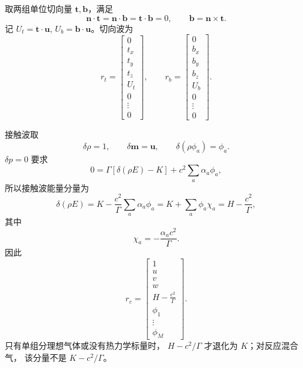 \documentclass[11pt,a4paper,fontset=fandol]{ctexart}
\newcommand{\nn}{\bm{n}}
\newcommand{\uu}{\bm{u}}
\newcommand{\Gammaone}{\Gamma}
\begin{document}
取两组单位切向量 \(\bm{t},\bm{b}\)，满足
\[
\nn\cdot\bm{t}=\nn\cdot\bm{b}=\bm{t}\cdot\bm{b}=0,
\qquad
\bm{b}=\nn\times\bm{t}.
\]
记 \(U_t=\bm{t}\cdot\uu\), \(U_b=\bm{b}\cdot\uu\)。切向波为
\[
r_t=
\begin{bmatrix}
0\\t_x\\t_y\\t_z\\U_t\\0\\\vdots\\0
\end{bmatrix},
\qquad
r_b=
\begin{bmatrix}
0\\b_x\\b_y\\b_z\\U_b\\0\\\vdots\\0
\end{bmatrix}.
\]

接触波取
\[
\delta\rho=1,\qquad \delta\bm{m}=\uu,\qquad
\delta(\rho\phi_a)=\phi_a .
\]
\(\delta p=0\) 要求
\[
0=\Gammaone\left[\delta(\rho E)-K\right]
+c^2\sum_a\alpha_a\phi_a ,
\]
所以接触波能量分量为
\[
\delta(\rho E)
=K-\frac{c^2}{\Gammaone}\sum_a\alpha_a\phi_a
=K+\sum_a\phi_a\chi_a
=H-\frac{c^2}{\Gammaone},
\]
其中
\[
\boxed{\chi_a=-\frac{\alpha_a c^2}{\Gammaone}}.
\]
因此
\[
r_c=
\begin{bmatrix}
1\\u\\v\\w\\H-\frac{c^2}{\Gammaone}\\\phi_1\\\vdots\\\phi_M
\end{bmatrix}.
\]
只有单组分理想气体或没有热力学标量时，
\(H-c^2/\Gammaone\) 才退化为 \(K\)；对反应混合气，
该分量不是 \(K-c^2/\Gammaone\)。
\end{document}
